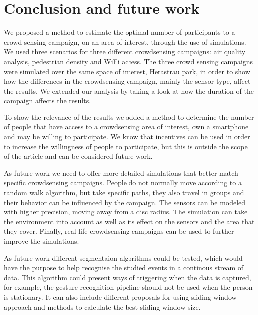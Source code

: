 \chapter{Conclusion and future work}
\label{chapter:conclusion}

We proposed a method to estimate the optimal number of participants to a crowd sensing campaign, on an area of interest, through the use of simulations. We used three scenarios for three different crowdsensing campaigns: air quality analysis, pedestrian density and WiFi access. The three crowd sensing campaigns were simulated over the same space of interest, Herastrau park, in order to show how the differences in the crowdsensing campaign, mainly the sensor type, affect the results. We extended our analysis by taking a look at how the duration of the campaign affects the results.

To show the relevance of the results we added a method to determine the number of people that have access to a crowdsensing area of interest, own a smartphone and may be willing to participate. We know that incentives can be used in order to increase the willingness of people to participate, but this is outside the scope of the article and can be considered future work.

As future work we need to offer more detailed simulations that better match specific crowdsensing campaigns. People do not normally move according to a random walk algorithm, but take specific paths, they also travel in groups and their behavior can be influenced by the campaign. The sensors can be modeled with higher precision, moving away from a disc radius. The simulation can take the environment into account as well as its effect on the sensors and the area that they cover. Finally, real life crowdsensing campaigns can be used to further improve the simulations.

As future work different segmentaion algorithms could be tested, which would have the purpose to help recognise the studied events in a continous stream of data. This algorithm could present ways of triggering when the data is captured, for example, the gesture recognition pipeline should not be used when the person is stationary. It can also include different proposals for using sliding window approach and methods to calculate the best sliding window size.
